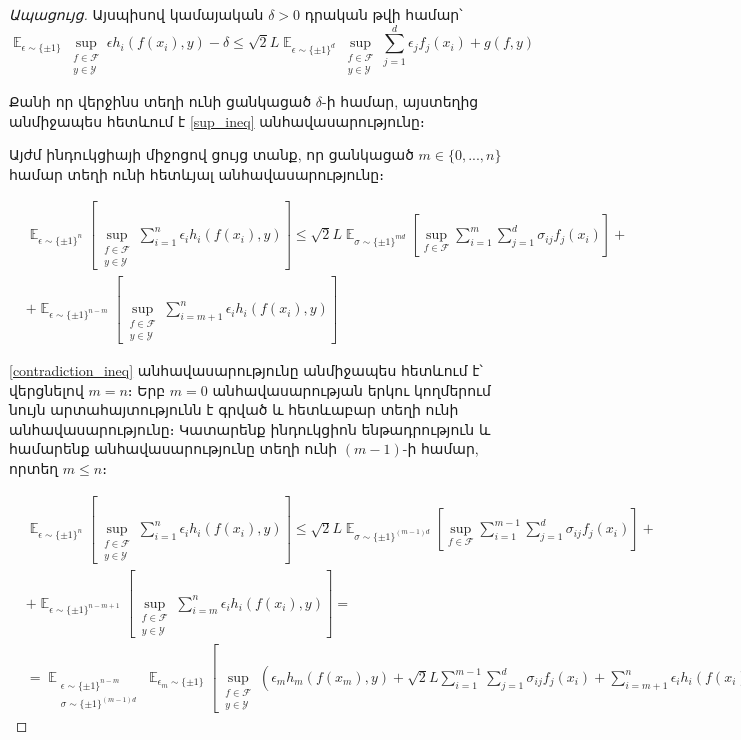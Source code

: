 \documentclass[11pt]{article}
\DeclareMathOperator*{\E}{\mathbb{E}}
\begin{document}
\begin{proof}[Ապացույց]
Այսպիսով կամայական $\delta > 0$ դրական թվի համար՝
$$\E_{\epsilon \sim \{\pm1\}}\sup_{\substack{f \in \mathcal{F} \\ y \in \mathcal{Y}}}    {\epsilon h_i(f(x_i), y)} - \delta  \leq {\sqrt{2}L} \E_{\epsilon \sim \{\pm 1\}^d}        \sup_{\substack{f \in \mathcal{F}  \\ y \in \mathcal{Y}  }}     \sum_{j=1}^d \epsilon_j f_j(x_i)    +   g(f, y)   $$

Քանի որ վերջինս տեղի ունի ցանկացած  $\delta$-ի համար, այստեղից անմիջապես հետևում է \ref{sup_ineq} անհավասարությունը։

\par Այժմ ինդուկցիայի միջոցով ցույց տանք,
որ  ցանկացած $m \in \{0, ..., n\}$ համար տեղի ունի հետևյալ անհավասարությունը։

\begin{align*}
&\E_{\epsilon \sim \{\pm 1\}^n}\left[\sup_{\substack{f \in \mathcal{F} \\ y \in \mathcal{Y}} }  \sum_{i=1}^n{\epsilon_ih_i(f(x_i), y)}  \right]    \leq \sqrt{2}L \E_{\sigma \sim \{\pm1\}^{md}} \left[  \sup_{f \in \mathcal{F}}  \sum_{i=1}^m\sum_{j=1}^d{\sigma_{ij}f_j(x_i)}   \right] +\\ &+\E_{\epsilon \sim \{\pm 1\}^{n-m}}\left[\sup_{\substack{f \in \mathcal{F} \\ y \in \mathcal{Y}} }  \sum_{i=m+1}^n{\epsilon_ih_i(f(x_i), y)}  \right]   
\end{align*}

\ref{contradiction_ineq} անհավասարությունը անմիջապես հետևում է՝ վերցնելով $m = n$։ Երբ $m=0$ անհավասարության երկու կողմերում նույն արտահայտությունն է գրված և հետևաբար տեղի ունի անհավասարությունը։ Կատարենք ինդուկցիոն ենթադրություն և համարենք անհավասարությունը տեղի ունի $(m-1)$-ի համար, որտեղ $m \leq n$։



\begin{align*}
&\E_{\epsilon \sim \{\pm 1\}^n}\left[\sup_{\substack{f \in \mathcal{F} \\ y \in \mathcal{Y}} }  \sum_{i=1}^n{\epsilon_ih_i(f(x_i), y)}  \right]   
 \leq \sqrt{2}L \E_{\sigma \sim \{\pm1\}^{(m-1)d}} \left[  \sup_{f \in \mathcal{F}}  \sum_{i=1}^{m-1}\sum_{j=1}^d{\sigma_{ij}f_j(x_i)}   \right] +\\ 
 &+\E_{\epsilon \sim \{\pm 1\}^{n-m+1}}\left[\sup_{\substack{f \in \mathcal{F} \\ y \in \mathcal{Y}} }  \sum_{i=m}^n{\epsilon_ih_i(f(x_i), y)}  \right] = \\  
 &= \E_{\substack{\epsilon \sim \{ \pm 1\}^{n-m}   \\ \sigma \sim \{ \pm 1\}^{(m-1)d} }}     \E_{\epsilon_m \sim \{ \pm1 \}} \left [          \sup_{\substack{f \in \mathcal{F} \\ y \in \mathcal{Y}}}     \left(\epsilon_m h_m(f(x_m), y)   +   \sqrt{2}L 				 \sum_{i=1}^{m-1}\sum_{j=1}^d{\sigma_{ij}f_j(x_i)}  + \sum_{i = m+1}^n \epsilon_ih_i(f(x_i), y)				\right )	\right ]
\end{align*}



\end{proof}
\end{document}
